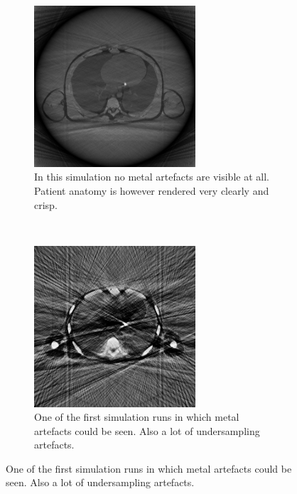 \begin{figure}[h!]
	\centering	
	\begin{subfigure}[h]{0.45\textwidth}
		\centering
		\includegraphics[height=6cm]{images/sim05.png}
		\caption{In this simulation no metal artefacts are visible at all. Patient anatomy is however rendered very clearly and crisp.}
		\label{sim05}
	\end{subfigure}%
	~
	\begin{subfigure}[h]{0.45\textwidth}
		\centering
		\includegraphics[height=6cm]{images/sim06.png}
		\caption{One of the first simulation runs in which metal artefacts could be seen. Also a lot of undersampling artefacts.}
		\label{sim06}
	\end{subfigure}%
\end{figure}

